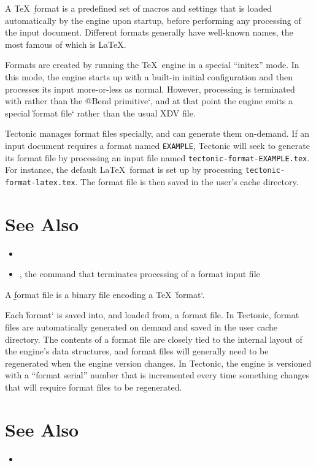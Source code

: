 
A \TeX\ \b{format} is a predefined set of macros and settings that is loaded
automatically by the engine upon startup, before performing any processing of
the input document. Different formats generally have well-known names, the most
famous of which is \LaTeX.

Formats are created by running the \TeX\ engine in a special “initex” mode. In
this mode, the engine starts up with a built-in initial configuration and then
processes its input more-or-less as normal. However, processing is terminated
with  rather than \`the @Bend primitive`, and at that point the engine
emits a special \`format file` rather than the usual XDV file.

Tectonic manages format files specially, and can generate them on-demand. If an
input document requires a format named \texttt{EXAMPLE}, Tectonic will seek to
generate its format file by processing an input file named
\texttt{tectonic-format-EXAMPLE.tex}. For instance, the default \LaTeX\ format
is set up by processing \texttt{tectonic-format-latex.tex}. The format file is
then saved in the user's cache directory.

\section*{See Also}

\begin{itemize}
\item {}
\item {}, the command that terminates processing of a format input file
\end{itemize}

\tduxEmit



A \b{format file} is a binary file encoding a \TeX\ \`format`.

Each \`format` is saved into, and loaded from, a format file. In Tectonic,
format files are automatically generated on demand and saved in the user cache
directory. The contents of a format file are closely tied to the internal layout
of the engine's data structures, and format files will generally need to be
regenerated when the engine version changes. In Tectonic, the engine is
versioned with a “format serial” number that is incremented every time something
changes that will require format files to be regenerated.

\section*{See Also}

\begin{itemize}
\item {}
\end{itemize}
